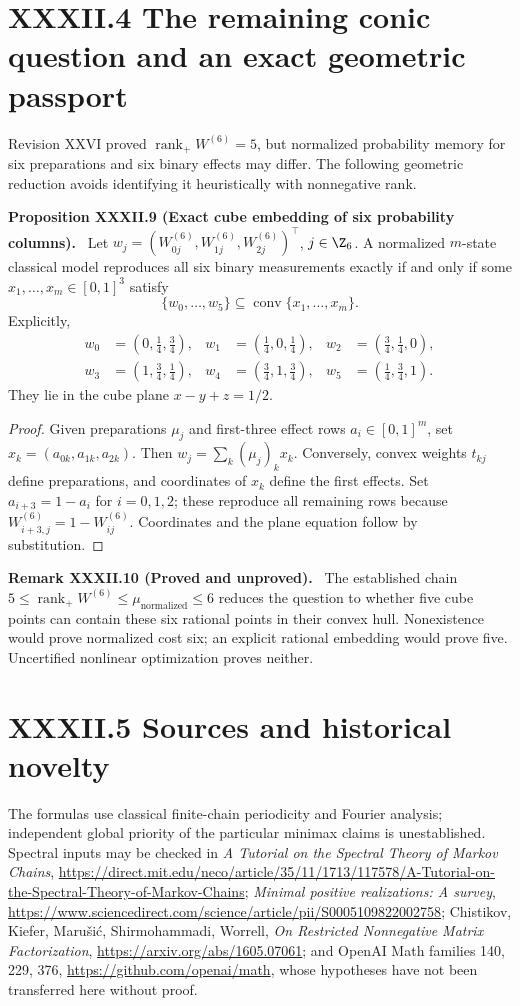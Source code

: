 \documentclass[11pt,a4paper,oneside]{book}
\DeclareMathOperator{\rank}{rank}\DeclareMathOperator{\Tr}{Tr}
\newcommand{\statement}[3]{\par\medskip\noindent\textbf{#1 #2 (#3).}\ }
\begin{document}
\section*{XXXII.4 The remaining conic question and an exact geometric passport}
Revision XXVI proved $\rank_+W^{(6)}=5$, but normalized probability memory for six preparations and six binary effects may differ. The following geometric reduction avoids identifying it heuristically with nonnegative rank.
\statement{Proposition}{XXXII.9}{Exact cube embedding of six probability columns} Let $w_j=(W^{(6)}_{0j},W^{(6)}_{1j},W^{(6)}_{2j})^\top$, $j\in\Z_6$. A normalized $m$-state classical model reproduces all six binary measurements exactly if and only if some $x_1,\ldots,x_m\in[0,1]^3$ satisfy
\begin{equation}\{w_0,\ldots,w_5\}\subseteq\operatorname{conv}\{x_1,\ldots,x_m\}.\tag{119}\end{equation}
Explicitly,
\begin{align*}w_0&=(0,\tfrac14,\tfrac34),&w_1&=(\tfrac14,0,\tfrac14),&w_2&=(\tfrac34,\tfrac14,0),\\w_3&=(1,\tfrac34,\tfrac14),&w_4&=(\tfrac34,1,\tfrac34),&w_5&=(\tfrac14,\tfrac34,1).
\end{align*}
They lie in the cube plane $x-y+z=1/2$.
\begin{proof}Given preparations $\mu_j$ and first-three effect rows $a_i\in[0,1]^m$, set $x_k=(a_{0k},a_{1k},a_{2k})$. Then $w_j=\sum_k(\mu_j)_kx_k$. Conversely, convex weights $t_{kj}$ define preparations, and coordinates of $x_k$ define the first effects. Set $a_{i+3}=1-a_i$ for $i=0,1,2$; these reproduce all remaining rows because $W^{(6)}_{i+3,j}=1-W^{(6)}_{ij}$. Coordinates and the plane equation follow by substitution.\end{proof}
\statement{Remark}{XXXII.10}{Proved and unproved} The established chain $5\le\rank_+W^{(6)}\le\mu_{\mathrm{normalized}}\le6$ reduces the question to whether five cube points can contain these six rational points in their convex hull. Nonexistence would prove normalized cost six; an explicit rational embedding would prove five. Uncertified nonlinear optimization proves neither.
\section*{XXXII.5 Sources and historical novelty}
The formulas use classical finite-chain periodicity and Fourier analysis; independent global priority of the particular minimax claims is unestablished. Spectral inputs may be checked in \textit{A Tutorial on the Spectral Theory of Markov Chains}, \url{https://direct.mit.edu/neco/article/35/11/1713/117578/A-Tutorial-on-the-Spectral-Theory-of-Markov-Chains}; \textit{Minimal positive realizations: A survey}, \url{https://www.sciencedirect.com/science/article/pii/S0005109822002758}; Chistikov, Kiefer, Maru\v si\'c, Shirmohammadi, Worrell, \textit{On Restricted Nonnegative Matrix Factorization}, \url{https://arxiv.org/abs/1605.07061}; and OpenAI Math families 140, 229, 376, \url{https://github.com/openai/math}, whose hypotheses have not been transferred here without proof.
\end{document}
